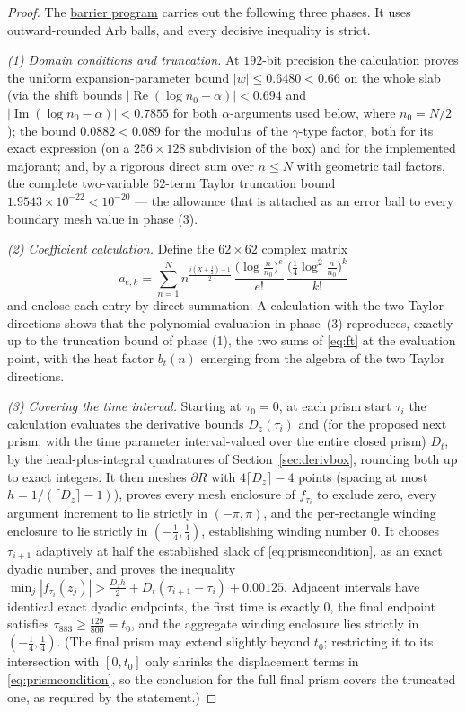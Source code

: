 \documentclass[11pt]{article}
\theoremstyle{definition}
\newcommand{\programlink}[2]{\href{https://github.com/judegomila/dbn-lambda-01787854-candidate-audit/blob/6222740efae58d773a70ff929cf12a34932d2af0/#1}{#2}}
\DeclareMathOperator{\Rea}{Re}
\DeclareMathOperator{\Ima}{Im}
\begin{document}
\begin{proof}
The \programlink{dan-reworking/code/prop612/prop612_proof.c}{barrier program}
carries out the following three phases.  It uses outward-rounded Arb balls,
and every decisive inequality is strict.

\emph{(1) Domain conditions and truncation.} At $192$-bit precision the
calculation proves the uniform
expansion-parameter
bound $|w|\le0.6480<0.66$ on the whole slab (via the shift bounds
$|\Rea(\log n_0-\alpha)|<0.694$ and $|\Ima(\log n_0-\alpha)|<0.7855$
for both $\alpha$-arguments used below, where $n_0=N/2$); the bound
$0.0882<0.089$ for the modulus of the $\gamma$-type factor, both
for its exact expression (on a $256\times128$ subdivision of the
box) and for the implemented majorant; and, by a rigorous direct
sum over $n\le N$ with geometric tail factors, the complete
two-variable $62$-term Taylor truncation bound
$1.9543\times10^{-22}<10^{-20}$ --- the allowance that is attached
as an error ball to every boundary mesh value in phase (3).

\emph{(2) Coefficient calculation.} Define the $62\times62$ complex matrix
\[
a_{e,k}
=\sum_{n=1}^{N}n^{\frac{i(X+\frac12)-1}{2}}
\,\frac{\bigl(\log\frac n{n_0}\bigr)^e}{e!}
\,\frac{\bigl(\frac14\log^2\frac n{n_0}\bigr)^k}{k!}
\]
and enclose each entry by direct summation. A calculation with the two Taylor
directions shows that the polynomial evaluation in phase~(3)
reproduces, exactly up to the truncation bound of phase (1),
the two sums of \eqref{eq:ft} at the evaluation point, with the
heat factor $b_t(n)$ emerging from the algebra of the two Taylor
directions.

\emph{(3) Covering the time interval.} Starting at $\tau_0=0$, at each
prism start $\tau_i$ the calculation evaluates the
derivative bounds $D_z(\tau_i)$ and (for the proposed next prism, with
the time parameter interval-valued over the entire closed prism)
$D_t$, by the head-plus-integral quadratures of
Section~\ref{sec:derivbox}, rounding both up to exact integers.  It then
meshes $\partial R$ with $4\lceil D_z\rceil-4$ points (spacing at
most $h=1/(\lceil D_z\rceil-1)$), proves every mesh enclosure of
$f_{\tau_i}$ to exclude zero, every argument increment to lie
strictly in $(-\pi,\pi)$, and the per-rectangle winding enclosure
to lie strictly in $(-\frac14,\frac14)$, establishing winding number $0$.
It chooses $\tau_{i+1}$ adaptively at half the established slack of
\eqref{eq:prismcondition}, as an exact dyadic number, and proves the inequality
$\min_j|f_{\tau_i}(z_j)|>\frac{D_zh}2+D_t(\tau_{i+1}-\tau_i)
+0.00125$. Adjacent intervals have identical exact dyadic endpoints, the
first time is exactly $0$, the final endpoint satisfies
$\tau_{883}\ge\frac{129}{800}=t_0$, and the aggregate winding enclosure
lies strictly in $(-\frac14,\frac14)$. (The final prism may
extend slightly beyond $t_0$; restricting it to its intersection
with $[0,t_0]$ only shrinks the displacement terms in
\eqref{eq:prismcondition}, so the conclusion for the full final prism covers
the truncated one, as required by the statement.)


\end{proof}
\end{document}

